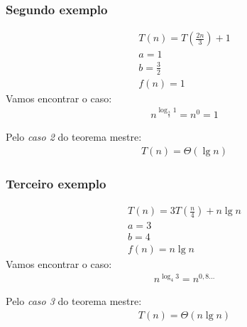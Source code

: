 \documentclass{article}
\begin{document}
\subsubsection{Segundo exemplo}
\begin{align*}
    T(n) = T(\frac{2n}{3}) + 1 \\
    a = 1 \\
    b = \frac{3}{2} \\
    f(n) = 1
\end{align*}
Vamos encontrar o caso:
\begin{align*}
    n^{\log_{\frac{3}{2}}1}= n^0 = 1
\end{align*}

Pelo \textit{caso 2} do teorema mestre:
\begin{align*}
    T(n) = \Theta(\lg n)
\end{align*}


\subsubsection{Terceiro exemplo}
\begin{align*}
    T(n) = 3T(\frac{n}{4}) + n \lg n \\
    a = 3 \\
    b = 4 \\
    f(n) = n \lg n
\end{align*}
Vamos encontrar o caso:
\begin{align*}
    n^{\log_4 3}= n^{0,8...}
\end{align*}

Pelo \textit{caso 3} do teorema mestre:
\begin{align*}
    T(n) = \Theta(n \lg n)
\end{align*}
\end{document}
